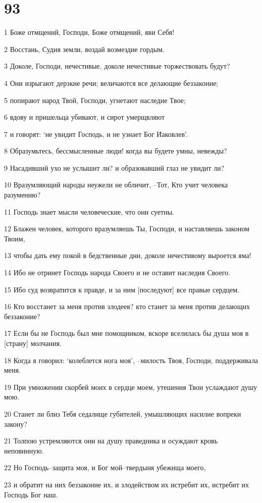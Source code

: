 \chapter{93}

\par 1 Боже отмщений, Господи, Боже отмщений, яви Себя!
\par 2 Восстань, Судия земли, воздай возмездие гордым.
\par 3 Доколе, Господи, нечестивые, доколе нечестивые торжествовать будут?
\par 4 Они изрыгают дерзкие речи; величаются все делающие беззаконие;
\par 5 попирают народ Твой, Господи, угнетают наследие Твое;
\par 6 вдову и пришельца убивают, и сирот умерщвляют
\par 7 и говорят: `не увидит Господь, и не узнает Бог Иаковлев'.
\par 8 Образумьтесь, бессмысленные люди! когда вы будете умны, невежды?
\par 9 Насадивший ухо не услышит ли? и образовавший глаз не увидит ли?
\par 10 Вразумляющий народы неужели не обличит, --Тот, Кто учит человека разумению?
\par 11 Господь знает мысли человеческие, что они суетны.
\par 12 Блажен человек, которого вразумляешь Ты, Господи, и наставляешь законом Твоим,
\par 13 чтобы дать ему покой в бедственные дни, доколе нечестивому выроется яма!
\par 14 Ибо не отринет Господь народа Своего и не оставит наследия Своего.
\par 15 Ибо суд возвратится к правде, и за ним [последуют] все правые сердцем.
\par 16 Кто восстанет за меня против злодеев? кто станет за меня против делающих беззаконие?
\par 17 Если бы не Господь был мне помощником, вскоре вселилась бы душа моя в [страну] молчания.
\par 18 Когда я говорил: `колеблется нога моя', --милость Твоя, Господи, поддерживала меня.
\par 19 При умножении скорбей моих в сердце моем, утешения Твои услаждают душу мою.
\par 20 Станет ли близ Тебя седалище губителей, умышляющих насилие вопреки закону?
\par 21 Толпою устремляются они на душу праведника и осуждают кровь неповинную.
\par 22 Но Господь--защита моя, и Бог мой--твердыня убежища моего,
\par 23 и обратит на них беззаконие их, и злодейством их истребит их, истребит их Господь Бог наш.

